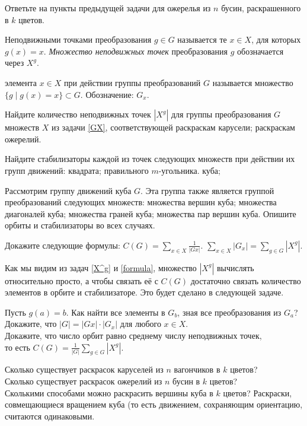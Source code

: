 \documentclass[a4paper,12pt]{article}
\begin{document}
  Ответьте на пункты предыдущей задачи для ожерелья из $n$ бусин, раскрашенного в $k$ цветов.

 Неподвижными точками преобразования $g \in G$ называется те $x \in X$, для которых $g(x)=x$. {\it Множество неподвижных точек} преобразования $g$ обозначается через $X^g$.

  элемента $x \in X$ при действии группы преобразований $G$ называется
множество $\{g \mid g(x)=x\} \subset G$.
 Обозначение: $G_x$.

\label{X^g} Найдите количество неподвижных точек $|X^g|$ для группы преобразования $G$ множеств $X$ из задачи \ref{GX}, соответствующей  раскраскам карусели;  раскраскам ожерелий.

Найдите стабилизаторы каждой из точек следующих множеств при действии их групп движений:
квадрата;
правильного $m$-угольника.
куба;

Рассмотрим группу движений куба $G$. Эта группа также является группой преобразований следующих множеств:
 множества вершин куба;
 множества диагоналей куба;
 множества граней куба;
 множества пар вершин куба.
Опишите орбиты и стабилизаторы во всех случаях.

\label{formula} Докажите следующие формулы:
 $C(G) = \sum\limits_{x\in X}\frac{1}{|Gx|}$.
 $\sum\limits_{x\in X} |G_x| = \sum_{g\in G}|X^g|$.

 Как мы видим из задач \ref{X^g} и \ref{formula}, множество $|X^g|$ вычислять относительно просто, а чтобы связать её с $C(G)$ достаточно связать количество элементов в орбите и стабилизаторе. Это будет сделано в следующей задаче.

 Пусть $g(a) = b$. Как найти все элементы в $G_b$, зная все преобразования из $G_a$?
\\ Докажите, что $|G| = |Gx|\cdot |G_x|$ для любого $x\in X$.
\\ Докажите, что число орбит равно среднему числу неподвижных точек, \\
то есть $C(G) = \frac{1}{|G|}\sum_{g\in G}|X^g|$.

 Сколько существует раскрасок каруселей из $n$ вагончиков в $k$ цветов?
\\ Сколько существует раскрасок ожерелий из $n$ бусин в $k$ цветов?
\\ Сколькими способами можно раскрасить вершины куба в $k$ цветов? Раскраски, совмещающиеся вращением куба (то есть движением, сохраняющим ориентацию, считаются одинаковыми.



\end{document}
